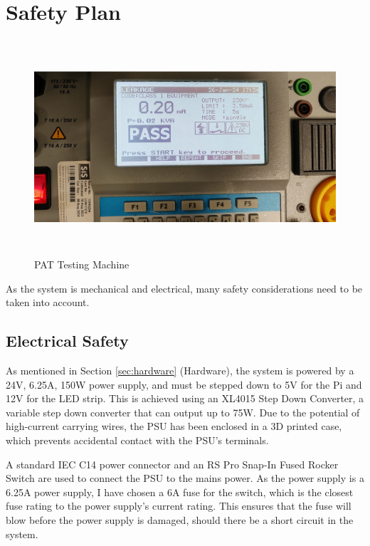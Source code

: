 \section{Safety Plan}

\begin{figure}[t]
    \begin{minipage}[t]{\textwidth}
        \centering
        \includegraphics[width=\textwidth,height=8cm, keepaspectratio]{imgs/pattesting.jpeg}
        \caption{PAT Testing Machine}
        \label{fig:pat}
      \end{minipage}
      \hfill
  \end{figure}
As the system is mechanical and electrical, many safety considerations need to be taken into account.
\subsection{Electrical Safety}
As mentioned in Section \ref*{sec:hardware} (Hardware), the system is powered by a 24V, 6.25A, 150W power supply, and must be stepped down to 5V for the Pi and 12V for the LED strip. This is achieved using an XL4015 Step Down Converter\cite{xl4015}, a variable step down converter that can output up to 75W.
Due to the potential of high-current carrying wires, the PSU has been enclosed in a 3D printed case, which prevents accidental contact with the PSU's terminals.

A standard IEC C14 power connector and an RS Pro Snap-In Fused Rocker Switch\cite{rsproc14switch} are used to connect the PSU to the mains power.
As the power supply is a 6.25A power supply, I have chosen a 6A fuse for the switch, which is the closest fuse rating to the power supply's
current rating. This ensures that the fuse will blow before the power supply is damaged, should there be a short circuit in the system.

